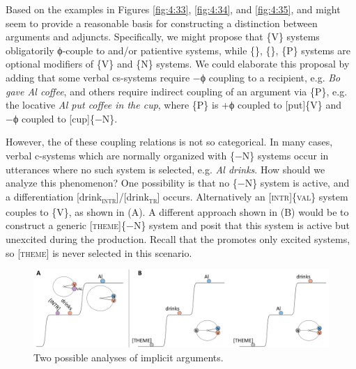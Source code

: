   Based on the examples in Figures {\ref{fig:4:33}}, {\ref{fig:4:34}}, and {\ref{fig:4:35}},  and  might seem to provide a reasonable basis for constructing a distinction between arguments and adjuncts. Specifically, we might propose that \{V\} systems obligatorily ϕ-couple to  and/or patientive systems, while \{\}, \{\}, \{P\} systems are optional modifiers of \{V\} and \{N\} systems. We could elaborate this proposal by adding that some verbal cs-systems require −ϕ coupling to a recipient, e.g. \textit{Bo gave Al coffee}, and others require indirect coupling of an argument via \{P\}, e.g. the locative \textit{Al put coffee in the cup}, where \{P\} is +ϕ coupled to [put]\{V\} and −ϕ coupled to [cup]\{−N\}.

  However, the  of these coupling relations is not so categorical. In many cases, verbal c-systems which are normally organized with \{−N\} systems occur in utterances where no such system is selected, e.g. \textit{Al drinks}. How should we analyze this phenomenon? One possibility is that no \{−N\} system is active, and a differentiation [drink\textsc{\textsubscript{intr}}]/[drink\textsc{\textsubscript{tr}}] occurs. Alternatively an [\textsc{intr}]\{\textsc{val}\} system couples to \{V\}, as shown in {}(A). A different approach shown in (B) would be to construct a generic [\textsc{theme}]\{−N\} system and posit that this system is active but unexcited during the production. Recall that the  promotes only excited systems, so [\textsc{theme}] is never selected in this scenario. 

  
\begin{figure}
\includegraphics[width=\textwidth]{figures/Tilsen-img86.png}
\caption{Two possible analyses of implicit arguments.}
\label{fig:4:36}
\end{figure}
 

